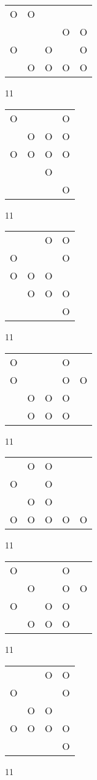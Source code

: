 \begin{tabular}{|m{0.2cm}m{0.2cm}m{0.2cm}m{0.2cm}m{0.2cm}|}\hline
O&O& & & \\
 & & &O&O\\
O& &O& &O\\
 &O&O&O&O\\
\hline\end{tabular}11
\begin{tabular}{|m{0.2cm}m{0.2cm}m{0.2cm}m{0.2cm}|}\hline
O& & &O\\
 &O&O&O\\
O&O&O&O\\
 & &O& \\
 & & &O\\
\hline\end{tabular}11
\begin{tabular}{|m{0.2cm}m{0.2cm}m{0.2cm}m{0.2cm}|}\hline
 & &O&O\\
O& & &O\\
O&O&O& \\
 &O&O&O\\
 & & &O\\
\hline\end{tabular}11
\begin{tabular}{|m{0.2cm}m{0.2cm}m{0.2cm}m{0.2cm}m{0.2cm}|}\hline
O& & &O& \\
O& & &O&O\\
 &O&O&O& \\
 &O&O&O& \\
\hline\end{tabular}11
\begin{tabular}{|m{0.2cm}m{0.2cm}m{0.2cm}m{0.2cm}m{0.2cm}|}\hline
 &O&O& & \\
O& &O& & \\
 &O&O& & \\
O&O&O&O&O\\
\hline\end{tabular}11
\begin{tabular}{|m{0.2cm}m{0.2cm}m{0.2cm}m{0.2cm}m{0.2cm}|}\hline
O& & &O& \\
 &O& &O&O\\
O& &O&O& \\
 &O&O&O& \\
\hline\end{tabular}11
\begin{tabular}{|m{0.2cm}m{0.2cm}m{0.2cm}m{0.2cm}|}\hline
 & &O&O\\
O& & &O\\
 &O&O& \\
O&O&O&O\\
 & & &O\\
\hline\end{tabular}11

